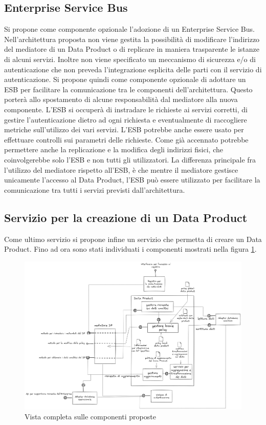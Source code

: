 \documentclass[12pt]{report}
\begin{document}
\subsection{Enterprise Service Bus}
Si propone come componente opzionale l'adozione di un Enterprise Service Bus.
Nell'architettura proposta non viene gestita la possibilità di modificare l'indirizzo del mediatore di un Data Product o di replicare in maniera trasparente le istanze di alcuni servizi.
Inoltre non viene specificato un meccanismo di sicurezza e/o di autenticazione che non preveda l'integrazione esplicita delle parti con il servizio di autenticazione.
Si propone quindi come componente opzionale di adottare un ESB per facilitare la comunicazione tra le componenti dell'architettura.
Questo porterà allo spostamento di alcune responsabilità dal mediatore alla nuova componente.
L'ESB si occuperà di instradare le richieste ai servizi corretti, di gestire l'autenticazione dietro ad ogni richiesta e  eventualmente di raccogliere metriche sull'utilizzo dei vari servizi.
L'ESB potrebbe anche essere usato per effettuare controlli sui parametri delle richieste.
Come già accennato potrebbe permettere anche la replicazione e la modifica degli indirizzi fisici, che coinvolgerebbe solo l'ESB e non tutti gli utilizzatori.
La differenza principale fra l'utilizzo del mediatore rispetto all'ESB, è che mentre il mediatore gestisce unicamente l'accesso al Data Product, l'ESB può essere utilizzato per facilitare la comunicazione tra tutti i servizi previsti dall'architettura.
\subsection{Servizio per la creazione di un Data Product}
Come ultimo servizio si propone infine un servizio che permetta di creare un Data Product.
Fino ad ora sono stati individuati i componenti mostrati nella figura \ref{fig:architettura completa}.
\begin{figure}
    \centering
    \includegraphics[width=\linewidth]{immagini/disegno completo architettura 2024-03-12 18.03.16.excalidraw.png}
    \caption{Vista completa sulle componenti proposte}
    \label{fig:architettura completa}
\end{figure}
\end{document}
